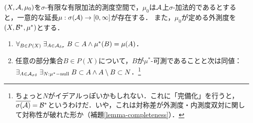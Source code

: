\documentclass[uplatex, dvipdfmx]{jsreport}
\begin{document}
\begin{lemma}\label{lemma-complesion}
    $(X,\mathcal{A},\mu_0)$を$\sigma$-有限な有限加法的測度空間で，$\mu_0$は$\mathcal{A}$上$\sigma$-加法的であるとすると，一意的な延長$\mu:\sigma(\mathcal{A})\to[0,\infty]$が存在する．
    また，$\mu_0$が定める外測度を$(X,\mathcal{B}^*,\mu^*)$とする．
    \begin{enumerate}
        \item $\forall_{B\in P(X)}\;\exists_{A\in\mathcal{A}_{\delta\sigma}}\;B\subset A\land\mu^*(B)=\mu(A)$．
        \item 任意の部分集合$B\in P(X)$について，$B$が$\mu^*$-可測であることと次は同値：$\exists_{A\in\mathcal{A}_{\sigma\delta}}\;\exists_{N:\mu^*\mathrm{-null}}\;B\subset A\land A\setminus B\subset N$．\footnote{ちょっと$N$がイデアルっぽいかもしれない．これに「完備化」を行うと，$\overline{\sigma(\mathcal{A})}=\mathcal{B}^*$というわけだ．いや，これは対称差が外測度・内測度双対に関して対称性が破れた形か（補題\ref{lemma-completeness}）．}
    \end{enumerate}
\end{lemma}
\end{document}
